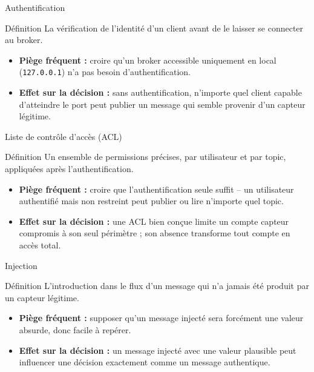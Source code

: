 \documentclass[aspectratio=169]{beamer}
\begin{document}
\begin{frame}{Authentification}
  \begin{block}{Définition}
    La vérification de l'identité d'un client avant de le laisser se connecter au broker.
  \end{block}
  \begin{itemize}
    \item \textbf{Piège fréquent :} croire qu'un broker accessible uniquement en local (\texttt{127.0.0.1}) n'a pas besoin d'authentification.
    \item \textbf{Effet sur la décision :} sans authentification, n'importe quel client capable d'atteindre le port peut publier un message qui semble provenir d'un capteur légitime.
  \end{itemize}
\end{frame}

\begin{frame}{Liste de contrôle d'accès (ACL)}
  \begin{block}{Définition}
    Un ensemble de permissions précises, par utilisateur et par topic, appliquées après l'authentification.
  \end{block}
  \begin{itemize}
    \item \textbf{Piège fréquent :} croire que l'authentification seule suffit -- un utilisateur authentifié mais non restreint peut publier ou lire n'importe quel topic.
    \item \textbf{Effet sur la décision :} une ACL bien conçue limite un compte capteur compromis à son seul périmètre ; son absence transforme tout compte en accès total.
  \end{itemize}
\end{frame}

\begin{frame}{Injection}
  \begin{block}{Définition}
    L'introduction dans le flux d'un message qui n'a jamais été produit par un capteur légitime.
  \end{block}
  \begin{itemize}
    \item \textbf{Piège fréquent :} supposer qu'un message injecté sera forcément une valeur absurde, donc facile à repérer.
    \item \textbf{Effet sur la décision :} un message injecté avec une valeur plausible peut influencer une décision exactement comme un message authentique.
  \end{itemize}
\end{frame}
\end{document}
